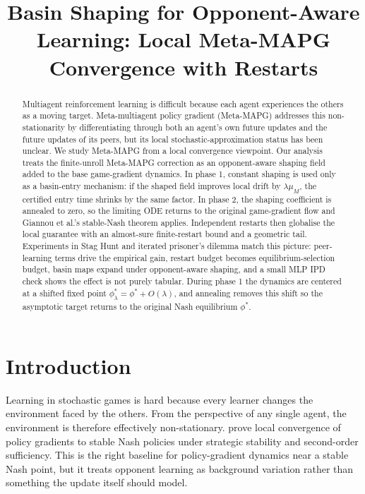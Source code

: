 \documentclass{nextgame2026} %
\title[Basin Shaping for Opponent-Aware Learning]{Basin Shaping for Opponent-Aware Learning: Local Meta-MAPG Convergence with Restarts}
\begin{document}
\maketitle

\begin{abstract}%
Multiagent reinforcement learning is difficult because each agent experiences the others as a moving target. Meta-multiagent policy gradient (Meta-MAPG) addresses this non-stationarity by differentiating through both an agent's own future updates and the future updates of its peers, but its local stochastic-approximation status has been unclear. We study Meta-MAPG from a local convergence viewpoint. Our analysis treats the finite-unroll Meta-MAPG correction as an opponent-aware shaping field added to the base game-gradient dynamics. In phase 1, constant shaping is used only as a basin-entry mechanism: if the shaped field improves local drift by $\lambda\mu_M$, the certified entry time shrinks by the same factor. In phase 2, the shaping coefficient is annealed to zero, so the limiting ODE returns to the original game-gradient flow and Giannou et al.'s stable-Nash theorem applies. Independent restarts then globalise the local guarantee with an almost-sure finite-restart bound and a geometric tail. Experiments in Stag Hunt and iterated prisoner's dilemma match this picture: peer-learning terms drive the empirical gain, restart budget becomes equilibrium-selection budget, basin maps expand under opponent-aware shaping, and a small MLP IPD check shows the effect is not purely tabular.
During phase 1 the dynamics are centered at a shifted fixed point $\phi^\ast_\lambda=\phi^\ast+O(\lambda)$, and annealing removes this shift so the asymptotic target returns to the original Nash equilibrium $\phi^\ast$.
\end{abstract}

\section{Introduction}

Learning in stochastic games is hard because every learner changes the environment faced by the others. From the perspective of any single agent, the environment is therefore effectively non-stationary. \citet{giannou2022convergence} prove local convergence of policy gradients to stable Nash policies under strategic stability and second-order sufficiency. This is the right baseline for policy-gradient dynamics near a stable Nash point, but it treats opponent learning as background variation rather than something the update itself should model.
\end{document}
